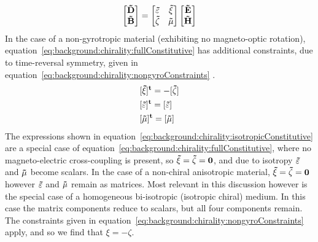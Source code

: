 \begin{equation}\label{eq:background:chirality:fullConstitutive}
    \begin{bmatrix}
        \bf{\tilde D} \\
        \bf{\tilde B}
    \end{bmatrix}
    =
    \begin{bmatrix}
        \bf{\tilde \varepsilon} & \bf{\tilde \xi} \\
        \bf{\tilde \zeta} & \bf{\tilde \mu}
    \end{bmatrix}
    \begin{bmatrix}
        \bf{\tilde E} \\
        \bf{\tilde H}
    \end{bmatrix}
\end{equation}
In the case of a non-gyrotropic material (exhibiting no magneto-optic rotation), equation~\ref{eq:background:chirality:fullConstitutive} has additional constraints, due to time-reversal symmetry, given in equation~\ref{eq:background:chirality:nongyroConstraints} \cite{Ishimaru2003}.
\begin{equation}\label{eq:background:chirality:nongyroConstraints}
    \begin{split}
        &[\bf{\tilde \xi}]^t = -[\bf{\tilde \zeta}] \\
        &[\bf{\tilde \varepsilon}]^t = [\bf{\tilde \varepsilon}] \\
        &[\bf{\tilde \mu}]^t = [\bf{\tilde \mu}]
    \end{split}
\end{equation}
The expressions shown in equation~\ref{eq:background:chirality:isotropicConstitutive} are a special case of equation~\ref{eq:background:chirality:fullConstitutive}, where no magneto-electric cross-coupling is present, so $\bf{\tilde \xi}=\bf{\tilde \zeta}=0$, and due to isotropy $\bf{\tilde \varepsilon}$ and $\bf{\tilde \mu}$ become scalars. 
In the case of a non-chiral anisotropic material, $\bf{\tilde \xi}=\bf{\tilde \zeta}=0$ however $\bf{\tilde \varepsilon}$ and $\bf{\tilde \mu}$ remain as matrices. Most relevant in this discussion however is the special case of a homogeneous bi-isotropic (isotropic chiral) medium. 
In this case the matrix components reduce to scalars, but all four components remain. The constraints given in equation~\ref{eq:background:chirality:nongyroConstraints} apply, and so we find that $\xi =-\zeta $.


